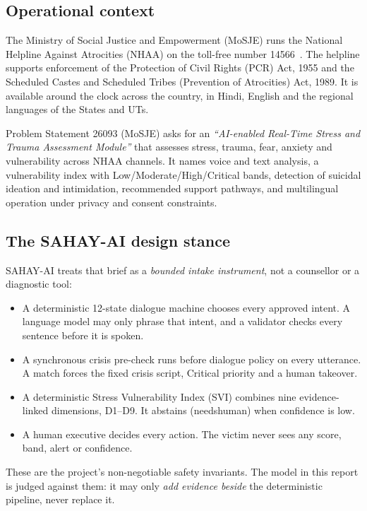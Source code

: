 \documentclass[11pt,a4paper]{article}
\newcommand{\codeus}{\textunderscore\allowbreak}
\DeclareRobustCommand{\code}[1]{{\ttfamily\let\_\codeus #1}}
\begin{document}
\subsection{Operational context}
The Ministry of Social Justice and Empowerment (MoSJE) runs the National Helpline Against Atrocities
(NHAA) on the toll-free number 14566~\cite{pib2021}. The helpline supports enforcement of the
Protection of Civil Rights (PCR) Act, 1955 and the Scheduled Castes and Scheduled Tribes (Prevention
of Atrocities) Act, 1989. It is available around the clock across the country, in Hindi, English and
the regional languages of the States and UTs.

Problem Statement 26093 (MoSJE) asks for an \emph{``AI-enabled Real-Time Stress and
Trauma Assessment Module''} that assesses stress, trauma, fear, anxiety and vulnerability across NHAA
channels. It names voice and text analysis, a vulnerability index with Low/Moderate/High/Critical
bands, detection of suicidal ideation and intimidation, recommended support pathways, and multilingual
operation under privacy and consent constraints.

\subsection{The SAHAY-AI design stance}
SAHAY-AI treats that brief as a \emph{bounded intake instrument}, not a counsellor or a diagnostic
tool:
\begin{itemize}
  \item A deterministic 12-state dialogue machine chooses every approved intent. A language model
        may only phrase that intent, and a validator checks every sentence before it is spoken.
  \item A synchronous crisis pre-check runs before dialogue policy on every utterance. A match
        forces the fixed crisis script, Critical priority and a human takeover.
  \item A deterministic Stress Vulnerability Index (SVI) combines nine evidence-linked dimensions,
        D1--D9. It abstains (\code{needs\_human}) when confidence is low.
  \item A human executive decides every action. The victim never sees any score, band, alert or
        confidence.
\end{itemize}
These are the project's non-negotiable safety invariants. The model in this report is judged against
them: it may only \emph{add evidence beside} the deterministic pipeline, never replace it.
\end{document}
